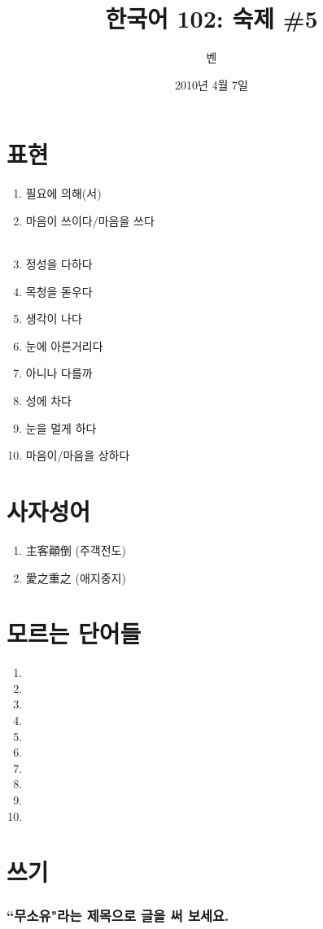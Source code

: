 \documentclass[11pt]{article}
\title{한국어 102: 숙제 \#5}
\author{벤}
\date{2010년 4월 7일}
\begin{document}
\maketitle
\thispagestyle{empty}
\pagestyle{empty}

\section{표현}
\begin{enumerate}
\item 필요에 의해(서) \\
\item 마음이 쓰이다/마음을 쓰다 \\\
\item 정성을 다하다 \\
\item 목청을 돋우다 \\
\item 생각이 나다 \\
\item 눈에 아른거리다 \\
\item 아니나 다를까 \\
\item 성에 차다 \\
\item 눈을 멀게 하다 \\
\item 마음이/마음을 상하다 \\
\end{enumerate}

\section{사자성어}
\begin{enumerate}
\item 主客顚倒 (주객전도) \\
\item 愛之重之 (애지중지) \\
\end{enumerate}

\section{모르는 단어들}
\begin{enumerate}
  \item 
  \item 
  \item 
  \item 
  \item 
  \item 
  \item 
  \item 
  \item 
  \item 
\end{enumerate}
\section{쓰기}
\doublespacing
\subsubsection*{``무소유"라는 제목으로 글을 써 보세요.}
\end{document}

